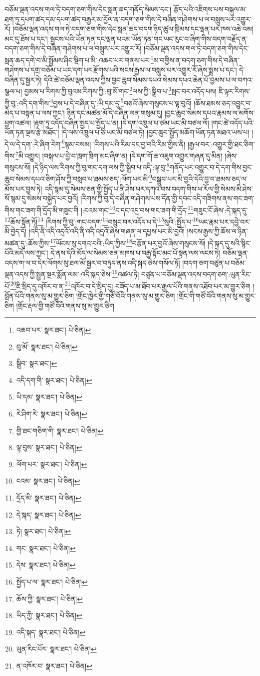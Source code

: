 བཅོམ་ལྡན་འདས་གལ་ཏེ་བདག་ཅག་གིས་དེང་སླན་ཆད་གནོད་སེམས་དང་། རྩོད་པའི་འཇིགས་པས་བསྐུལ་མ་ཐག་ཏུ་དཔག་ཚད་དམ་དཔག་ཚད་བརྒྱར་མ་བྱོལ་ན་བདག་ཅག་གིས་དེ་བཞིན་གཤེགས་པ་ལ་བསླུས་པར་འགྱུར་རོ། །བཅོམ་ལྡན་འདས་གལ་ཏེ་བདག་ཅག་གིས་དེང་སླན་ཆད་བདག་ཉིད་ཚུལ་ཁྲིམས་དང་ལྡན་པར་ཁས་འཆེ་འམ། མང་དུ་ཐོས་པ་དང་། སྦྱངས་པའི་ཡོན་ཏན་དང་ལྡན་པའམ་ཡོན་ཏན་གང་ཡང་རུང་བ་ཞིག་གིས་བདག་བརྗོད་ན་བདག་ཅག་གིས་དེ་བཞིན་གཤེགས་པ་ལ་བསླུས་པར་འགྱུར་རོ། །བཅོམ་ལྡན་འདས་གལ་ཏེ་བདག་ཅག་གིས་དེང་སླན་ཆད་དགེ་བ་མི་སྤྱོམས་ཤིང་སྡིག་པ་མི་:འཆབ་པར་གནས་པར་\footnote{འཆབ་པར་  སྣར་ཐང་།  པེ་ཅིན། }མ་བགྱིས་ན་བདག་ཅག་གིས་དེ་བཞིན་གཤེགས་པ་དགྲ་བཅོམ་པ་ཡང་དག་པར་རྫོགས་པའི་སངས་རྒྱས་ལ་བསླུས་པར་འགྱུར་རོ་ཞེས་སྨྲས་པ་དང་། དེ་བཞིན་དུ་སྦྱར་ཏེ། དེའི་ཚེ་བཅོམ་ལྡན་འདས་ཀྱིས་བྱང་ཆུབ་སེམས་དཔའ་སེམས་དཔའ་ཆེན་པོ་བྱམས་པ་ལ་བཀའ་སྩལ་པ། བྱམས་པ་རིགས་ཀྱི་བུའམ་རིགས་ཀྱི་:བུ་མོ་གང་\footnote{བུ་མོ་  སྣར་ཐང་།  པེ་ཅིན། }ལས་ཀྱི་:སྒྲིབ་པ་\footnote{སྒྲིབ་  སྣར་ཐང་། }སྤང་བར་འདོད་པས། ཇི་ལྟར་རིགས་ཀྱི་བུ་:འདི་དག་གིས་\footnote{འདི་དག་གི་  སྣར་ཐང་།  པེ་ཅིན། }བྱས་པ་དེ་བཞིན་དུ་:ཡི་དམ་དུ་\footnote{ཡི་དམ་  སྣར་ཐང་།  པེ་ཅིན། }བཅའོ་ཞེས་གསུངས་པ་ལྟ་བུའོ། །ཆོས་ཐམས་ཅད་འབྱུང་བ་མེད་པ་བསྟན་པ་ལས་ཀྱང་། ཉིན་དང་མཚན་མོ་དེ་བཞིན་ལན་གསུམ་དུ། །བྱང་ཆུབ་སེམས་དཔའ་རྣམས་ལ་མགོས་ཕྱག་འཚལ། །རྟག་ཏུ་འདོད་བཞིན་སྤྱད་པ་སྤྱོད་པ་ན། །དེ་དག་འཁྲུལ་པ་ཙམ་ཡང་མི་བཙལ་ལོ། །གང་ཚེ་འདོད་པའི་ཡོན་ཏན་ལྔས་རྩེ་མཐོང་། །དེ་ལས་འཁྲུལ་པ་ཅི་ཡང་མི་བཙལ་ཏེ། །བྱང་ཆུབ་སྤྱོད་མཆོག་ཡོན་ཏན་མཐའ་ཡས་པ། །དེ་ལ་དེ་དག་:རེ་ཞིག་རེག་\footnote{རེ་ཤིག་རེ་  སྣར་ཐང་།  པེ་ཅིན། }སྙམ་བསམ། །རིགས་པའི་རིམ་དང་བྱ་བའི་རིམ་གྱིས་ནི། །རྒྱལ་བར་:འགྱུར་གྱི་ཐང་ཅིག་གིས་\footnote{གྱི་ཐང་གཅིག་གི་  སྣར་ཐང་།  པེ་ཅིན། }མི་འགྱུར། །བསྐལ་པ་བྱེ་བ་ཁྲག་ཁྲིག་མང་ཞིག་ན། །དེ་དག་གོ་ཆ་འཇུག་འགྱུར་གཞན་དུ་མིན། །ཞེས་གསུངས་སོ། །དེ་ཉིད་ལས་རིགས་ཀྱི་བུ་གང་དག་ལས་ཀྱི་སྒྲིབ་པ་འདི་:ལྟ་བུ་\footnote{ལྟ་བུས་  སྣར་ཐང་།  པེ་ཅིན། }གནོད་པར་འགྱུར་བ་དེ་དག་གིས་བྱང་ཆུབ་སེམས་དཔའ་ཅིག་ཤོས་ཀྱི་བསླབ་པ་ཐམས་ཅད་:ལོག་པར་མི་\footnote{ལོག་པར་  སྣར་ཐང་།  པེ་ཅིན། }བསྒྲུབ་པར་མི་བྱའི་དེའི་བྱ་བ་ཐམས་ཅད་ལ་མོས་པར་བྱས་ཏེ། འདི་སྙམ་དུ་སེམས་ཅན་གྱི་སྤྱོད་པ་ནི་ཤེས་པར་དཀའ་བས་བདག་གིས་ཕ་རོལ་གྱི་སེམས་མི་ཤེས་སོ་སྙམ་དུ་སེམས་བསྐྱེད་པར་བྱའོ། །རིགས་ཀྱི་བུ་དེ་བཞིན་གཤེགས་པས་དོན་གྱི་དབང་འདི་གཟིགས་ནས་གང་ཟག་གིས་གང་ཟག་གི་དྲོད་མི་གཟུང་གི །:ངའམ་གང་\footnote{ངའམ་  སྣར་ཐང་།  པེ་ཅིན། }ང་དང་འདྲ་བས་གང་ཟག་གི་དྲོད་\footnote{དྲོད་མི་  སྣར་ཐང་།  པེ་ཅིན། }གཟུང་ངོ་ཞེས་:དེ་སྐད་དུ་\footnote{དེ་སྐད་  སྣར་ཐང་།  པེ་ཅིན། }ཆོས་སྟོན་ཏོ།\footnote{ཏེ།  སྣར་ཐང་།  པེ་ཅིན། } །རིགས་ཀྱི་བུ་:གང་བདག་\footnote{གང་  སྣར་ཐང་།  པེ་ཅིན། }བསྲུང་བར་འདོད་པ་དེ་\footnote{དེས་  སྣར་ཐང་།  པེ་ཅིན། }སུའི་:སྤྱོད་པ་\footnote{སྤྱོད་པ་ལ་  སྣར་ཐང་།  པེ་ཅིན། }ཡང་རྣམ་པར་དབྱེ་བར་མི་བྱེད་དོ། །འདི་ནི་འདི་འདྲའོ་འདི་ནི་འདི་འདྲའོ་ཞེས་གཞན་ལ་དཔྱས་པར་མི་བྱའོ། །སངས་རྒྱས་ཀྱི་ཆོས་ལ་ཉིན་མཚན་དུ་:ཆོས་ཀྱིས་\footnote{ཆོས་ཀྱི་  སྣར་ཐང་།  པེ་ཅིན། }ཡོངས་སུ་དགའ་བའི་:ཡིད་ཀྱིས་\footnote{ཡིད་ཀྱི་  སྣར་ཐང་།  པེ་ཅིན། }བརྩོན་པར་བྱའོ་ཞེས་གསུངས་སོ། །དེ་སྐད་དུ་སའི་སྙིང་པོའི་མདོ་ལས་ཀྱང་། དེ་ནས་དེའི་མོད་ལ་སེམས་ཅན་མཁས་པ་བརྒྱ་སྟོང་མང་པོ་སྟན་ལས་ལངས་ཏེ། བཅོམ་ལྡན་འདས་ག་ལ་བ་དེར་ལོགས་སུ་ཐལ་མོ་སྦྱར་བ་བཏུད་ནས་འདི་སྐད་ཅེས་གསོལ་ཏོ། །བདག་ཅག་བཙུན་པ་བཅོམ་ལྡན་འདས་ཀྱི་སྤྱན་སྔར་སྨོན་ལམ་:འདི་སྐད་ཅེས་\footnote{འདི་སྐད་  སྣར་ཐང་།  པེ་ཅིན། }འཚལ་ཏེ། བཙུན་པ་བཅོམ་ལྡན་འདས་བདག་ཅག་:ཡུན་རིང་པོ་\footnote{ཡུན་རིང་པོར་  སྣར་ཐང་།  པེ་ཅིན། }ཇི་སྲིད་དུ་འཁོར་བ་ན་\footnote{ན་འཁོར་བ་  སྣར་ཐང་།  པེ་ཅིན། }འཁོར་བ་དེ་སྲིད་དུ། བཟོད་པ་མ་ཐོབ་པར་རྒྱལ་པོའི་གནས་འཐོབ་པར་མ་གྱུར་ཅིག །བློན་པོའི་གནས་སུ་མ་གྱུར་ཅིག །གྲོང་ཁྱེར་གྱི་གཙོ་བོའི་གནས་སུ་མ་གྱུར་ཅིག །གྲོང་གི་གཙོ་བོའི་གནས་སུ་མ་གྱུར་ཅིག །གྲོང་རྡལ་གྱི་གཙོ་བོའི་གནས་སུ་མ་གྱུར་ཅིག 